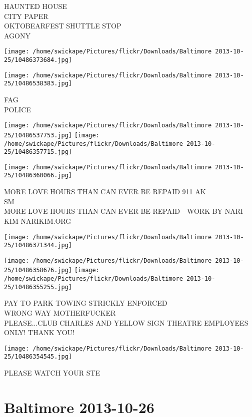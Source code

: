 \documentclass[10pt,letterpaper]{article}
\begin{document}
HAUNTED HOUSE\\
CITY PAPER\\
OKTOBEARFEST SHUTTLE STOP\\
AGONY
\pagebreak

\texttt{[image: /home/swickape/Pictures/flickr/Downloads/Baltimore 2013-10-25/10486373684.jpg]}

\vspace{0.25in}
\texttt{[image: /home/swickape/Pictures/flickr/Downloads/Baltimore 2013-10-25/10486538383.jpg]}

FAG\\
POLICE
\pagebreak

\texttt{[image: /home/swickape/Pictures/flickr/Downloads/Baltimore 2013-10-25/10486537753.jpg]}
\texttt{[image: /home/swickape/Pictures/flickr/Downloads/Baltimore 2013-10-25/10486357715.jpg]}

\texttt{[image: /home/swickape/Pictures/flickr/Downloads/Baltimore 2013-10-25/10486360066.jpg]}

MORE LOVE HOURS THAN CAN EVER BE REPAID 911 AK\\
SM\\
MORE LOVE HOURS THAN CAN EVER BE REPAID {-} WORK BY NARI KIM NARIKIM.ORG
\pagebreak

\texttt{[image: /home/swickape/Pictures/flickr/Downloads/Baltimore 2013-10-25/10486371344.jpg]}

\vspace{0.25in}
\texttt{[image: /home/swickape/Pictures/flickr/Downloads/Baltimore 2013-10-25/10486358676.jpg]}
\texttt{[image: /home/swickape/Pictures/flickr/Downloads/Baltimore 2013-10-25/10486355255.jpg]}

PAY TO PARK TOWING STRICKLY ENFORCED\\
WRONG WAY MOTHERFUCKER\\
PLEASE...CLUB CHARLES AND YELLOW SIGN THEATRE EMPLOYEES ONLY!  THANK YOU!
\pagebreak

\texttt{[image: /home/swickape/Pictures/flickr/Downloads/Baltimore 2013-10-25/10486354545.jpg]}

PLEASE WATCH YOUR STE
\pagebreak

\section*{Baltimore 2013-10-26}
\end{document}
